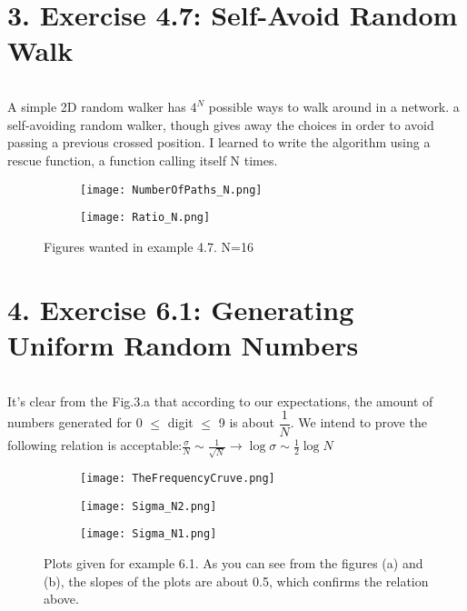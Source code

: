 \documentclass[12pt]{article}
\begin{document}
\part*{3. Exercise 4.7: Self-Avoid Random Walk}
\paragraph*{} A simple 2D random walker has $4^{N}$ possible ways to walk around in a network. a self-avoiding random walker, though gives away the choices in order to avoid passing a previous crossed position. I learned to write the algorithm using a rescue function, a function calling itself N times. 
\begin{figure}[H]
	\centering
	\begin{subfigure}[t]{0.8\textwidth}
		\texttt{[image: NumberOfPaths\_N.png]}
		\label{fig:mesh1.1}
		\caption{}
	\end{subfigure}\par\bigskip 
	\begin{subfigure}[t]{0.8\textwidth}
		\texttt{[image: Ratio\_N.png]}
		\label{fig:mesh1.2}
		\caption{}
	\end{subfigure}
	\label{fig:mesh1}
	\caption{Figures wanted in example 4.7. N=16}
\end{figure}
\part*{4. Exercise 6.1: Generating Uniform Random Numbers}
\paragraph*{} It's clear from the Fig.3.a that according to our expectations, the amount of numbers generated for 0 $\leq$ digit $\leq$ 9 is about $\dfrac{1}{N}$. We intend to prove the following relation is acceptable:$\frac{\sigma}{N} \sim \frac{1}{\sqrt{N}} \rightarrow \log \sigma \sim \frac{1}{2} \log N$
\begin{figure}[H]
	\centering
	\begin{subfigure}[t]{0.8\textwidth}
		\texttt{[image: TheFrequencyCruve.png]}
		\label{fig:mesh1.1}
		\caption{}
	\end{subfigure}\hfill%
	\begin{subfigure}[t]{0.48\textwidth}
		\texttt{[image: Sigma\_N2.png]}
		\label{fig:mesh1.2}
		\caption{}
	\end{subfigure}\hfill
	\begin{subfigure}[t]{0.48\textwidth}
		\texttt{[image: Sigma\_N1.png]}
		\label{fig:mesh1.2}
		\caption{}
	\end{subfigure}
	\label{fig:mesh1}
	\caption{Plots given for example 6.1. As you can see from the figures (a) and (b), the slopes of the plots are about 0.5, which confirms the relation above.}
\end{figure}
\end{document}
